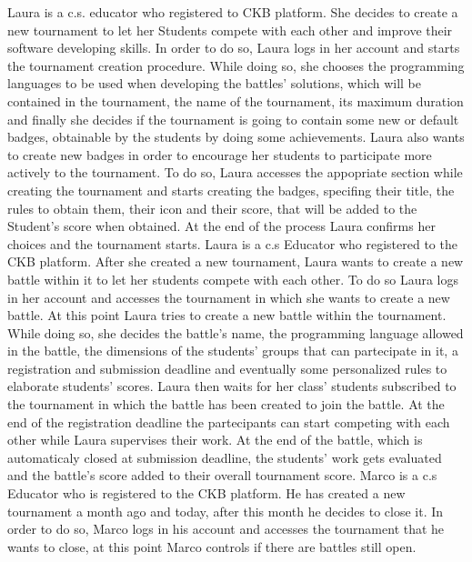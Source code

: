 \documentclass{article}
\newcounter{subsubsubsection}[subsubsection]
\begin{document}
{
Laura is a c.s. educator who registered to CKB platform. She decides to create a new tournament to let her Students compete with each other and improve their software developing skills. 
In order to do so, Laura logs in her account and starts the tournament creation procedure. 
While doing so, she chooses the programming languages to be used when developing the battles' solutions, which will be contained in the tournament, 
the name of the tournament, its maximum duration and finally she decides if the tournament is going to contain some new or default badges,
 obtainable by the students by doing some achievements.
Laura also wants to create new badges in order to encourage her students to participate more actively to the tournament. 
To do so, Laura accesses the appopriate section while creating the tournament and starts creating the badges, specifing their title, the rules to obtain them, their icon and their score, 
that will be added to the Student's score when obtained.
At the end of the process Laura confirms her choices and the tournament starts.
Laura is a c.s Educator who registered to the CKB platform. After she created a new tournament, Laura wants to create a new battle within it to let her students compete with each other. 
To do so Laura logs in her account and accesses the tournament in which she wants to create a new battle. 
At this point Laura tries to create a new battle within the tournament. 
While doing so, she decides the battle's name, the programming language allowed in the battle, the dimensions of the students' groups that can partecipate in it, 
a registration and submission deadline and eventually some personalized rules to elaborate students' scores.
Laura then waits for her class' students subscribed to the tournament in which the battle has been created to join the battle. 
At the end of the registration deadline the partecipants can start competing with each other while Laura supervises their work.
At the end of the battle, which is automaticaly closed at submission deadline, the students' work gets evaluated and the battle's score added to their overall tournament score.
Marco is a c.s Educator who is registered to the CKB platform. He has created a new tournament a month ago and today, after this month he decides to close it. 
In order to do so, Marco logs in his account and accesses the tournament that he wants to close, at this point Marco controls if there are battles still open. 
}
\end{document}
